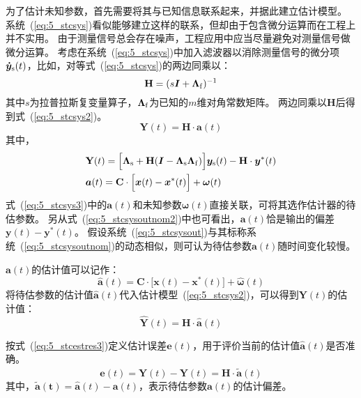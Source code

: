 \documentclass{article}
\begin{document}
为了估计未知参数，首先需要将其与已知信息联系起来，并据此建立估计模型。
系统~(\ref{eq:5_stcsys})看似能够建立这样的联系，但却由于包含微分运算而在工程上并不实用。
由于测量信号总会存在噪声，工程应用中应当尽量避免对测量信号做微分运算。
考虑在系统~(\ref{eq:5_stcsys})中加入滤波器以消除测量信号的微分项$\bm{\dot y}_{\rm{s}}(t)$，比如，对等式~(\ref{eq:5_stcsys})的两边同乘以：
\begin{equation}
\mathbf{H}=(s{\bm{I}}+\bm{\Lambda}_{\rm{f}})^{-1}
\label{eq:5_stcfilter}
\end{equation}
其中$s$为拉普拉斯复变量算子，$\bm{\Lambda}_{\rm{f}}$为已知的$m$维对角常数矩阵。
两边同乘以$\mathbf{H}$后得到式~(\ref{eq:5_stcsys2})。
\begin{equation}
    \mathbf{Y}(t)= \mathbf{H}\cdot\bm{a}(t)
\label{eq:5_stcsys2}
\end{equation}
其中，
\begin{equation}
\begin{aligned}
   &\mathbf{Y}(t)=\Big [ {\bm{\Lambda}}_{\rm{s}}+\mathbf{H}(\bm{I}-\bm{\Lambda}_{\rm{s}}\bm{\Lambda}_{\rm{f}})\Big ] \bm{y}_{\rm{s}}(t)-\mathbf{H} \cdot \bm{y}^{*}(t)\\
   &\bm{a}(t)=\mathbf{C}\cdot \Big [ \bm{x}(t)-\bm{x}^{*}(t) \Big ]+\bm{\omega}(t)\\
\label{eq:5_stcsys3}
\end{aligned}
\end{equation}
式~(\ref{eq:5_stcsys3})中的$\bm{a}(t)$和未知参数$\bm{\omega}(t)$直接关联，可将其选作估计器的待估参数。
另从式~(\ref{eq:5_stcsysoutnom2})中也可看出，$\bm{a}(t)$恰是输出的偏差$\bm{y}(t)-\bm{y}^{*}(t)$。
假设系统~(\ref{eq:5_stcsysout})与其标称系统~(\ref{eq:5_stcsysoutnom})的动态相似，则可认为待估参数$\bm{a}(t)$随时间变化较慢。

$\bm{a}(t)$的估计值可以记作：
\begin{equation}
\bm{\hat{a}}(t)=\mathbf{C}\cdot \Big [ \bm{x}(t)-\bm{x}^{*}(t) \Big ]+{\bm{\hat \omega}}(t)
\label{eq:5_stcestres}
\end{equation}
将待估参数的估计值$\bm{\hat{a}}(t)$代入估计模型~(\ref{eq:5_stcsys2})，可以得到$\mathbf{Y}(t)$的估计值：
\begin{equation}
   {\mathbf{\hat Y}}(t)= \mathbf{H}\cdot\bm{\hat a}(t)
\label{eq:5_stcestres2}
\end{equation}

按式~(\ref{eq:5_stcestres3})定义估计误差$\bm{e}(t)$，用于评价当前的估计值$\bm{\hat{a}}(t)$是否准确。
\begin{equation}
    \bm{e}(t)= {\mathbf{\hat Y}}(t)-\mathbf{Y}(t)=\mathbf{H}\cdot\bm{\tilde{a}}(t)
\label{eq:5_stcestres3}
\end{equation}
其中，$\bm{\tilde{a}(t)}=\bm{\hat{a}}(t)-\bm{a}(t)$，表示待估参数$\bm{a}(t)$的估计偏差。
\end{document}
